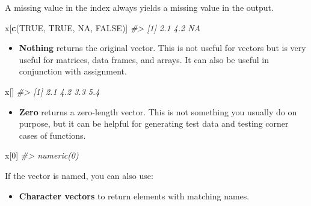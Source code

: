 \documentclass[]{book}
\newenvironment{Shaded}{\begin{snugshade}}{\end{snugshade}}
\newcommand{\KeywordTok}[1]{\textcolor[rgb]{0.13,0.29,0.53}{\textbf{#1}}}
\newcommand{\DecValTok}[1]{\textcolor[rgb]{0.00,0.00,0.81}{#1}}
\newcommand{\CommentTok}[1]{\textcolor[rgb]{0.56,0.35,0.01}{\textit{#1}}}
\newcommand{\OtherTok}[1]{\textcolor[rgb]{0.56,0.35,0.01}{#1}}
\newcommand{\NormalTok}[1]{#1}
\providecommand{\tightlist}{%
  \setlength{\itemsep}{0pt}\setlength{\parskip}{0pt}}
\theoremstyle{definition}
\theoremstyle{definition}
\theoremstyle{definition}
\theoremstyle{remark}
\begin{document}
A missing value in the index always yields a missing value in the
output.

\begin{Shaded}
\begin{Highlighting}[]
\NormalTok{x[}\KeywordTok{c}\NormalTok{(}\OtherTok{TRUE}\NormalTok{, }\OtherTok{TRUE}\NormalTok{, }\OtherTok{NA}\NormalTok{, }\OtherTok{FALSE}\NormalTok{)]}
\CommentTok{#> [1] 2.1 4.2  NA}
\end{Highlighting}
\end{Shaded}

\begin{itemize}
\tightlist
\item
  \textbf{Nothing} returns the original vector. This is not useful for
  vectors but is very useful for matrices, data frames, and arrays. It
  can also be useful in conjunction with assignment.
\end{itemize}

\begin{Shaded}
\begin{Highlighting}[]
\NormalTok{x[]}
\CommentTok{#> [1] 2.1 4.2 3.3 5.4}
\end{Highlighting}
\end{Shaded}

\begin{itemize}
\tightlist
\item
  \textbf{Zero} returns a zero-length vector. This is not something you
  usually do on purpose, but it can be helpful for generating test data
  and testing corner cases of functions.
\end{itemize}

\begin{Shaded}
\begin{Highlighting}[]
\NormalTok{x[}\DecValTok{0}\NormalTok{]}
\CommentTok{#> numeric(0)}
\end{Highlighting}
\end{Shaded}

If the vector is named, you can also use:

\begin{itemize}
\tightlist
\item
  \textbf{Character vectors} to return elements with matching names.
\end{itemize}
\end{document}

